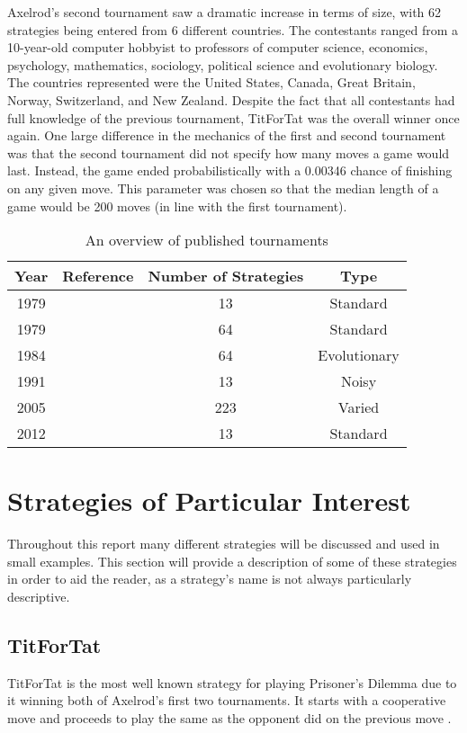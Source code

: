 Axelrod's second tournament \cite{Axelrod1980b} saw a dramatic increase in terms of size, with 62 strategies being entered from 6 different countries.
The contestants ranged from a 10-year-old computer hobbyist to professors of computer science, economics, psychology, mathematics, sociology, political science and evolutionary biology.
The countries represented were the United States, Canada, Great Britain, Norway, Switzerland, and New Zealand.
Despite the fact that all contestants had full knowledge of the previous tournament, TitForTat was the overall winner once again.
One large difference in the mechanics of the first and second tournament was that the second tournament did not specify how many moves a game would last.
Instead, the game ended probabilistically with a 0.00346 chance of finishing on any given move.
This parameter was chosen so that the median length of a game would be 200 moves (in line with the first tournament).

\begin{table}[htbp]
\centering
\begin{tabular}{c c c c}
\toprule
Year & Reference & Number of Strategies & Type\\
\midrule
1979 & \cite{Axelrod1980a} & 13 & Standard\\
1979 & \cite{Axelrod1980b} & 64 & Standard\\
1984 & \cite{Axelrod1981} & 64 & Evolutionary\\
1991 & \cite{Bendor1991} & 13 & Noisy\\
2005 & \cite{Chong2004} & 223 & Varied\\
2012 & \cite{Stewart2012} & 13 & Standard\\
\bottomrule
\end{tabular}
\label{tab:tournament_refs}
\caption{An overview of published tournaments}
\end{table}


\section{Strategies of Particular Interest}\label{sec:individual_strategies}
Throughout this report many different strategies will be discussed and used in small examples.
This section will provide a description of some of these strategies in order to aid the reader, as a strategy's name is not always particularly descriptive.

\subsection{TitForTat}\label{ssec:titfortat}
TitForTat is the most well known strategy for playing Prisoner's Dilemma due to it winning both of Axelrod's first two tournaments.
It starts with a cooperative move and proceeds to play the same as the opponent did on the previous move \cite{Axelrod1980b, Heap2003}.

